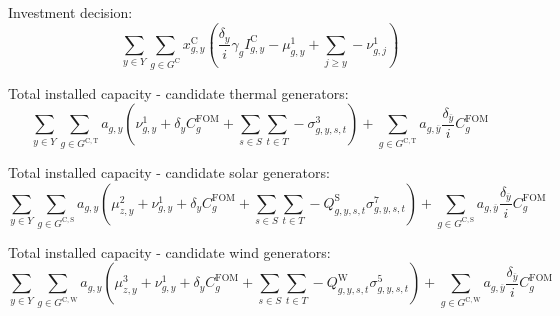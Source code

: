 \documentclass{article}
\newcommand{\sGeneratorsCandidate}{G^{\mathrm{C}}}
\newcommand{\sGeneratorsCandidateThermal}{G^{\mathrm{C,T}}}
\newcommand{\sGeneratorsCandidateWind}{G^{\mathrm{C,W}}}
\newcommand{\sGeneratorsCandidateSolar}{G^{\mathrm{C,S}}}
\newcommand{\sYears}{Y}
\newcommand{\sScenarios}{S}
\newcommand{\sIntervals}{T}
\newcommand{\iGenerator}{g}
\newcommand{\iYear}{y}
\newcommand{\iYearTerminal}{\overline{\iYear}}
\newcommand{\iYearAlias}{j}
\newcommand{\iScenario}{s}
\newcommand{\iInterval}{t}
\newcommand{\iZone}{z}
\newcommand{\cFixedOperationsMaintenanceCostGenerator}[1][\iGenerator]{C^{\mathrm{FOM}}_{#1}}
\newcommand{\cAmortisationRate}[1][\iGenerator]{\gamma_{#1}}
\newcommand{\cCandidateInvestmentCost}[1][\iGenerator,\iYear]{I^{\mathrm{C}}_{#1}}
\newcommand{\cInterestRate}{i}
\newcommand{\cCapacityFactorWind}[1][\iGenerator,\iYear,\iScenario,\iInterval]{Q_{#1}^{\mathrm{W}}}
\newcommand{\cCapacityFactorSolar}[1][\iGenerator,\iYear,\iScenario,\iInterval]{Q_{#1}^{\mathrm{S}}}
\newcommand{\cDiscountRate}[1][\iYear]{\delta_{#1}}
\newcommand{\vInstalledCapacity}[1][\iGenerator,\iYear]{x^{\mathrm{C}}_{#1}}
\newcommand{\vInstalledCapacityTotal}[1][\iGenerator,\iYear]{a_{#1}}
\newcommand{\dNonNegativeCandidateCapacity}[1][\iGenerator,\iYear]{\mu_{#1}^{1}}
\newcommand{\dSolarBuildLimit}[1][\iZone,\iYear]{\mu_{#1}^{2}}
\newcommand{\dWindBuildLimit}[1][\iZone,\iYear]{\mu_{#1}^{3}}
\newcommand{\dTotalInstallCapacity}[1][\iGenerator,\iYear]{\nu_{#1}^{1}}
\newcommand{\dMaxPowerOutputCandidateThermal}[1][\iGenerator,\iYear,\iScenario,\iInterval]{\sigma_{#1}^{3}}
\newcommand{\dMaxPowerOutputWindCandidate}[1][\iGenerator,\iYear,\iScenario,\iInterval]{\sigma_{#1}^{5}}
\newcommand{\dMaxPowerOutputSolarCandidate}[1][\iGenerator,\iYear,\iScenario,\iInterval]{\sigma_{#1}^{7}}
\begin{document}
Investment decision:
\begin{equation}
	\sum\limits_{\iYear \in \sYears} \sum\limits_{\iGenerator \in \sGeneratorsCandidate} \vInstalledCapacity \left(\frac{\cDiscountRate}{\cInterestRate} \cAmortisationRate \cCandidateInvestmentCost - \dNonNegativeCandidateCapacity + \sum\limits_{\iYearAlias \geq \iYear} -\dTotalInstallCapacity[\iGenerator,\iYearAlias] \right)
\end{equation}

Total installed capacity - candidate thermal generators:
\begin{equation}
\sum\limits_{\iYear \in \sYears} \sum\limits_{\iGenerator \in \sGeneratorsCandidateThermal} \vInstalledCapacityTotal \left(\dTotalInstallCapacity + \cDiscountRate \cFixedOperationsMaintenanceCostGenerator + \sum\limits_{\iScenario \in \sScenarios}\sum\limits_{\iInterval \in \sIntervals} - \dMaxPowerOutputCandidateThermal \right) + \sum\limits_{\iGenerator \in \sGeneratorsCandidateThermal} \vInstalledCapacityTotal[\iGenerator,\iYearTerminal] \frac{\cDiscountRate[\iYearTerminal]}{\cInterestRate} \cFixedOperationsMaintenanceCostGenerator
\end{equation}

Total installed capacity - candidate solar generators:
\begin{equation}
	\sum\limits_{\iYear \in \sYears} \sum\limits_{\iGenerator \in \sGeneratorsCandidateSolar} \vInstalledCapacityTotal \left(\dSolarBuildLimit + \dTotalInstallCapacity + \cDiscountRate \cFixedOperationsMaintenanceCostGenerator + \sum\limits_{\iScenario \in \sScenarios}\sum\limits_{\iInterval \in \sIntervals} - \cCapacityFactorSolar \dMaxPowerOutputSolarCandidate \right) + \sum\limits_{\iGenerator \in \sGeneratorsCandidateSolar} \vInstalledCapacityTotal[\iGenerator,\iYearTerminal] \frac{\cDiscountRate[\iYearTerminal]}{\cInterestRate} \cFixedOperationsMaintenanceCostGenerator
\end{equation}

Total installed capacity - candidate wind generators:
\begin{equation}
\sum\limits_{\iYear \in \sYears} \sum\limits_{\iGenerator \in \sGeneratorsCandidateWind} \vInstalledCapacityTotal \left( \dWindBuildLimit + \dTotalInstallCapacity + \cDiscountRate \cFixedOperationsMaintenanceCostGenerator + \sum\limits_{\iScenario \in \sScenarios}\sum\limits_{\iInterval \in \sIntervals} - \cCapacityFactorWind \dMaxPowerOutputWindCandidate \right) + \sum\limits_{\iGenerator \in \sGeneratorsCandidateWind} \vInstalledCapacityTotal[\iGenerator,\iYearTerminal] \frac{\cDiscountRate[\iYearTerminal]}{\cInterestRate} \cFixedOperationsMaintenanceCostGenerator
\end{equation}
\end{document}
